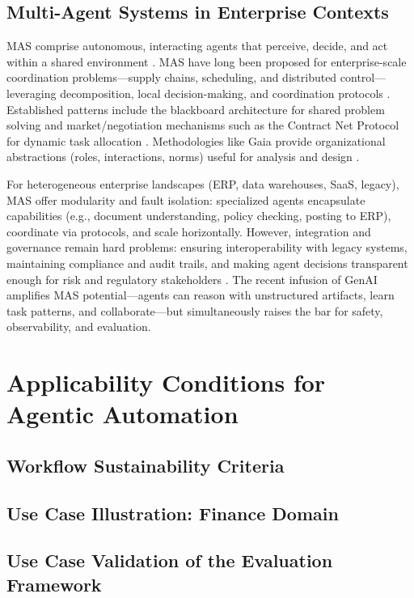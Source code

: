 \subsection{Multi-Agent Systems in Enterprise Contexts}
MAS comprise autonomous, interacting agents that perceive, decide, and act within a shared environment \parencite{Wooldridge2009}. MAS have long been proposed for enterprise-scale coordination problems—supply chains, scheduling, and distributed control—leveraging decomposition, local decision-making, and coordination protocols \parencite{Parunak1999,JenningsBussmann2003}. Established patterns include the blackboard architecture for shared problem solving \parencite{Nii1986} and market/negotiation mechanisms such as the Contract Net Protocol for dynamic task allocation \parencite{Smith1980}. Methodologies like Gaia provide organizational abstractions (roles, interactions, norms) useful for analysis and design \parencite{Zambonelli2003}.

For heterogeneous enterprise landscapes (ERP, data warehouses, SaaS, legacy), MAS offer modularity and fault isolation: specialized agents encapsulate capabilities (e.g., document understanding, policy checking, posting to ERP), coordinate via protocols, and scale horizontally. However, integration and governance remain hard problems: ensuring interoperability with legacy systems, maintaining compliance and audit trails, and making agent decisions transparent enough for risk and regulatory stakeholders \parencite{Luck2005}. The recent infusion of GenAI amplifies MAS potential—agents can reason with unstructured artifacts, learn task patterns, and collaborate—but simultaneously raises the bar for safety, observability, and evaluation.
\section{Applicability Conditions for Agentic Automation} 
\subsection{Workflow Sustainability Criteria}
\subsection{Use Case Illustration: Finance Domain}
\subsection{Use Case Validation of the Evaluation Framework}
\newpage  
